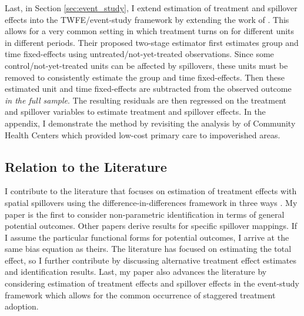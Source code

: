 \documentclass[11pt]{article}
\begin{document}
Last, in Section \ref{sec:event_study}, I extend estimation of treatment and spillover effects into the TWFE/event-study framework by extending the work of \citet{Gardner_2021}. This allows for a very common setting in which treatment turns on for different units in different periods. Their proposed two-stage estimator first estimates group and time fixed-effects using untreated/not-yet-treated observations. Since some control/not-yet-treated units can be affected by spillovers, these units must be removed to consistently estimate the group and time fixed-effects. Then these estimated unit and time fixed-effects are subtracted from the observed outcome \emph{in the full sample}. The resulting residuals are then regressed on the treatment and spillover variables to estimate treatment and spillover effects. In the appendix, I demonstrate the method by revisiting the analysis by \citet{Bailey_Goodman_Bacon_2015} of Community Health Centers which provided low-cost primary care to impoverished areas.

\subsection{Relation to the Literature} 

I contribute to the literature that focuses on estimation of treatment effects with spatial spillovers using the difference-in-differences framework in three ways \citep{Clarke_2017,Berg_Streitz_2019,Verbitsky-Savitz_Raudenbush_2012,Delgado_Florax_2015}. My paper is the first to consider non-parametric identification in terms of general potential outcomes. Other papers derive results for specific spillover mappings. If I assume the particular functional forms for potential outcomes, I arrive at the same bias equation as theirs. The literature has focused on estimating the total effect, so I further contribute by discussing alternative treatment effect estimates and identification results. Last, my paper also advances the literature by considering estimation of treatment effects and spillover effects in the event-study framework which allows for the common occurrence of staggered treatment adoption.
\end{document}
